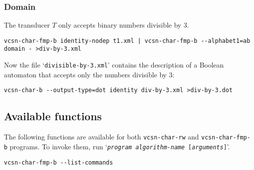 \documentclass[a4paper]{report}
\newenvironment{shell}
{\begin{alltt}}
{\end{alltt}}
\newcommand\file[1]{`\texttt{#1}'}
\newcommand\command[1]{\texttt{#1}}
\newcommand\var[1]{{\ttfamily\itshape #1}}
\newcommand\code[1]{\texttt{#1}}
\newcommand\samp[1]{`\texttt{#1}'}
\newcommand{\taffn}[1]{\code{#1}}
\begin{document}
\subsubsection{Domain}
The transducer $T$ only accepts binary numbers divisible by 3.

\begin{verbatim}
vcsn-char-fmp-b identity-nodep t1.xml | vcsn-char-fmp-b --alphabet1=ab domain - >div-by-3.xml
\end{verbatim}

Now the file \file{divisible-by-3.xml} contains the description of a
Boolean automaton that accepts only the numbers divisible by 3:

\begin{verbatim}
vcsn-char-b --output-type=dot identity div-by-3.xml >div-by-3.dot
\end{verbatim}



\subsection{Available functions}
The following functions are available for both \command{vcsn-char-rw}
and \command{vcsn-char-fmp-b} programs.  To invoke them, run
\samp{\var{program} \var{algorithm-name} [\var{arguments}]}.

\begin{verbatim}
vcsn-char-fmp-b --list-commands
\end{verbatim}
\end{document}
